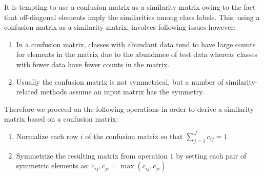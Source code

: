 It is tempting to use a confusion matrix as a similarity matrix owing to the fact that off-diagonal elements imply the similarities among class labels. This, using a confusion matrix as a similarity matrix, involves following issues however:
\begin{enumerate}
	\item In a confusion matrix, classes with abundant data tend to have large counts for elements in the matrix due to the abundance of test data whereas classes with fewer data have fewer counts in the matrix.
	\item Usually the confusion matrix is not symmetrical, but a number of similarity-related methods assume an input matrix has the symmetry.
\end{enumerate}

Therefore we proceed on the following operations in order to derive a similarity matrix based on a confusion matrix:
\begin{enumerate}
	\item Normalize each row $i$ of the confusion matrix so that $\sum_{j=1}^J c_{ij} = 1$
	\item Symmetrize the resulting matrix from operation $1$ by setting each pair of symmetric elements as: $c_{ij},c_{ji} = \max (c_{ij},c_{ji})$
\end{enumerate}
